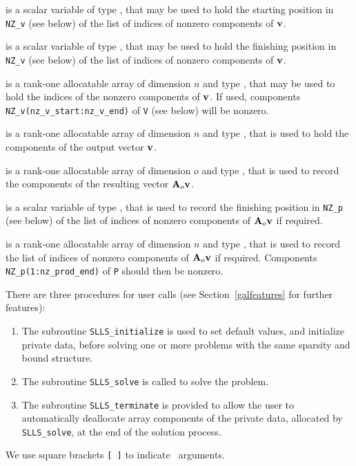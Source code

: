 \documentclass{galahad}
\newcommand{\packagename}{SLLS}
\begin{document}
\begin{description}

 is a scalar variable of type \integer, that
may be used to hold the starting position in {\tt NZ\_v} (see below)
of the list of indices of nonzero components of ${\mathbf{v}}$.

 is a scalar variable of type \integer, that
may be used to hold the finishing position in {\tt NZ\_v} (see below)
of the list of indices of nonzero components of ${\mathbf{v}}$.

 is a rank-one allocatable array of dimension $n$
and type \integer, that may be used to hold the indices of the
nonzero components of ${\mathbf{v}}$. If used, components
{\tt NZ\_v(nz\_v\_start:nz\_v\_end)} of {\tt V} (see below) will be nonzero.

 is a rank-one allocatable array of dimension $n$
and type \realdp, that is used to hold the components of the
output vector ${\mathbf{v}}$.

 is a rank-one allocatable array of dimension $o$
and type \realdp, that is used to record the components of the
resulting vector ${\mathbf{A}}_o {\mathbf{v}}$.

 is a scalar variable of type \integer, that
is used to record the finishing position in {\tt NZ\_p} (see below)
of the list of indices of nonzero components of ${\mathbf{A}}_o {\mathbf{v}}$ if required.

 is a rank-one allocatable array of dimension $n$
and type \integer, that is used to record the list of
indices of nonzero components of ${\mathbf{A}}_o {\mathbf{v}}$ if required. Components
{\tt NZ\_p(1:nz\_prod\_end)} of {\tt P} should then be nonzero.

\end{description}


\galarguments
There are three procedures for user calls
(see Section~\ref{galfeatures} for further features):

\begin{enumerate}
\item The subroutine
      {\tt \packagename\_initialize}
      is used to set default values, and initialize private data,
      before solving one or more problems with the
      same sparsity and bound structure.
\item The subroutine
      {\tt \packagename\_solve}
      is called to solve the problem.
\item The subroutine
      {\tt \packagename\_terminate}
      is provided to allow the user to automatically deallocate array
       components of the private data, allocated by
       {\tt \packagename\_solve},
       at the end of the solution process.
\end{enumerate}
We use square brackets {\tt [ ]} to indicate \optional\ arguments.
\end{document}
